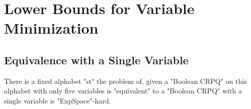 \section{Lower Bounds for Variable Minimization}
\label{apdx-sec:lowerbound-variables}

\subsection{Equivalence with a Single Variable}

\begin{theorem}
	\AP\label{thm:variable-minimization-lowerbound}
	There is a fixed alphabet "st" the problem of, given a "Boolean CRPQ"
	on this alphabet with only five variables is "equivalent"
	to a "Boolean CRPQ" with a single variable is "ExpSpace"-hard.
\end{theorem}

